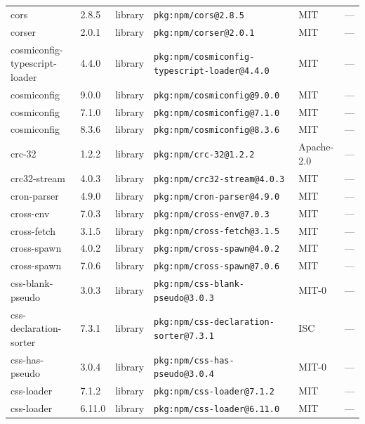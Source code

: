 \documentclass[11pt,a4paper]{article}
\begin{document}
\begin{longtable}{|p{4cm}|p{2cm}|p{1.6cm}|p{5cm}|p{1.5cm}|p{3.5cm}|}
\raggedright cors & 2.8.5 & library & \small\texttt{pkg:npm/cors@2.8.5} & MIT & \small — \\
\raggedright corser & 2.0.1 & library & \small\texttt{pkg:npm/corser@2.0.1} & MIT & \small — \\
\raggedright cosmiconfig-typescript-loader & 4.4.0 & library & \small\texttt{pkg:npm/cosmiconfig-typescript-loader@4.4.0} & MIT & \small — \\
\raggedright cosmiconfig & 9.0.0 & library & \small\texttt{pkg:npm/cosmiconfig@9.0.0} & MIT & \small — \\
\raggedright cosmiconfig & 7.1.0 & library & \small\texttt{pkg:npm/cosmiconfig@7.1.0} & MIT & \small — \\
\raggedright cosmiconfig & 8.3.6 & library & \small\texttt{pkg:npm/cosmiconfig@8.3.6} & MIT & \small — \\
\raggedright crc-32 & 1.2.2 & library & \small\texttt{pkg:npm/crc-32@1.2.2} & Apache-2.0 & \small — \\
\raggedright crc32-stream & 4.0.3 & library & \small\texttt{pkg:npm/crc32-stream@4.0.3} & MIT & \small — \\
\raggedright cron-parser & 4.9.0 & library & \small\texttt{pkg:npm/cron-parser@4.9.0} & MIT & \small — \\
\raggedright cross-env & 7.0.3 & library & \small\texttt{pkg:npm/cross-env@7.0.3} & MIT & \small — \\
\raggedright cross-fetch & 3.1.5 & library & \small\texttt{pkg:npm/cross-fetch@3.1.5} & MIT & \small — \\
\raggedright cross-spawn & 4.0.2 & library & \small\texttt{pkg:npm/cross-spawn@4.0.2} & MIT & \small — \\
\raggedright cross-spawn & 7.0.6 & library & \small\texttt{pkg:npm/cross-spawn@7.0.6} & MIT & \small — \\
\raggedright css-blank-pseudo & 3.0.3 & library & \small\texttt{pkg:npm/css-blank-pseudo@3.0.3} & MIT-0 & \small — \\
\raggedright css-declaration-sorter & 7.3.1 & library & \small\texttt{pkg:npm/css-declaration-sorter@7.3.1} & ISC & \small — \\
\raggedright css-has-pseudo & 3.0.4 & library & \small\texttt{pkg:npm/css-has-pseudo@3.0.4} & MIT-0 & \small — \\
\raggedright css-loader & 7.1.2 & library & \small\texttt{pkg:npm/css-loader@7.1.2} & MIT & \small — \\
\raggedright css-loader & 6.11.0 & library & \small\texttt{pkg:npm/css-loader@6.11.0} & MIT & \small — \\

\end{longtable}
\end{document}
